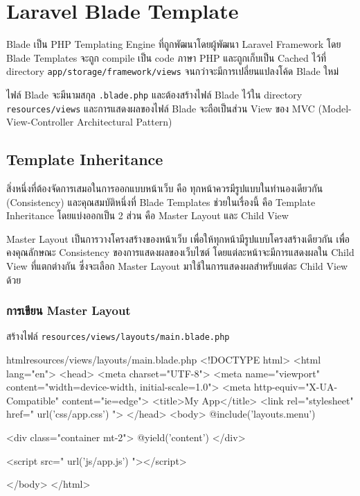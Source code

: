 \chapter{Laravel Blade Template}

Blade เป็น PHP Templating Engine ที่ถูกพัฒนาโดยผู้พัฒนา Laravel Framework 
โดย Blade Templates จะถูก compile เป็น code ภาษา PHP 
และถูกเก็บเป็น Cached ไว้ที่ directory \texttt{app/storage/framework/views} จนกว่าจะมีการเปลี่ยนแปลงโค้ด Blade ใหม่

ไฟล์ Blade จะมีนามสกุล \texttt{.blade.php} และต้องสร้างไฟล์ Blade 
ไว้ใน directory \texttt{resources/views} และการแสดงผลของไฟล์ Blade 
จะถือเป็นส่วน View ของ MVC (Model-View-Controller Architectural Pattern)

\section{Template Inheritance}

สิ่งหนึ่งที่ต้องจัดการเสมอในการออกแบบหน้าเว็บ คือ ทุกหน้าควรมีรูปแบบในทำนองเดียวกัน (Consistency) 
และคุณสมบัติหนึ่งที่ Blade Templates ช่วยในเรื่องนี้ คือ Template Inheritance 
โดยแบ่งออกเป็น 2 ส่วน คือ Master Layout และ Child View

Master Layout เป็นการวางโครงสร้างของหน้าเว็บ เพื่อให้ทุกหน้ามีรูปแบบโครงสร้างเดียวกัน เพื่อคงคุณลักษณะ Consistency ของการแสดงผลของเว็บไซต์
โดยแต่ละหน้าจะมีการแสดงผลใน Child View ที่แตกต่างกัน ซึ่งจะเลือก Master Layout มาใช้ในการแสดงผลสำหรับแต่ละ Child View ด้วย

\newpage

\subsection{การเขียน Master Layout}

สร้างไฟล์ \texttt{resources/views/layouts/main.blade.php}

\begin{code}{html}{resources/views/layouts/main.blade.php}{}
    <!DOCTYPE html>
    <html lang="en">
    <head>
        <meta charset="UTF-8">
        <meta name="viewport" 
            content="width=device-width, initial-scale=1.0">
        <meta http-equiv="X-UA-Compatible" content="ie=edge">
        <title>My App</title>
        <link rel="stylesheet" href="{{ url('css/app.css') }}">
    </head>
    <body>
        @include('layouts.menu')
        
        <div class="container mt-2">
            @yield('content')
        </div>
    
        <script src="{{ url('js/app.js') }}"></script>
    
    </body>
    </html>
\end{code}

